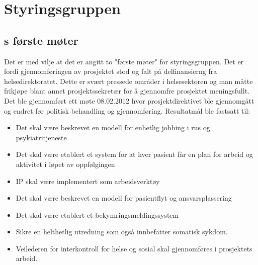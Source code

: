 \documentclass[11pt]{report} %
\begin{document}
                \section{Styringsgruppen}\label{sec:m_stygr}
                  \subsection{s første møter}\label{sec:stygr_1}
                 Det er med vilje at det er angitt to "første møter" for styringsgruppen. Det er fordi gjennomføringen av prosjektet stod og falt på delfinansierng fra helsedirektoratet. Dette er svært pressede områder i helsesektoren og man måtte frikjøpe blant annet prosjektssekretær for å gjennomfre prosjektet meningsfullt. \\
                 Det ble gjennomført ett møte 08.02.2012 hvor prosjektdirektivet\cite{ProPlan-1} ble gjennomgått og endret før politisk behandling og gjennomføring. Resultatmål ble fastsatt til:
                  \begin{itemize}
                  \item Det skal være beskrevet en modell for enhetlig jobbing i rus og psykiatritjeneste\\
                  \item Det skal være etablert et system for at hver pasient får en plan for arbeid og aktivitet i løpet av oppfølgingen\\
                  \item IP skal være implementert som arbeidsverktøy\\
                  \item Det skal være beskrevet en modell for pasientflyt og ansvarsplassering\\
                  \item Det skal være etablert et bekymringsmeldingssystem\\
                  \item Sikre en helthetlig utredning som også innbefatter somatisk sykdom.\\
                  \item Veilederen for interkontroll for helse og sosial skal gjennomføres i prosjektets arbeid.\\
                  \end{itemize}
\end{document}
